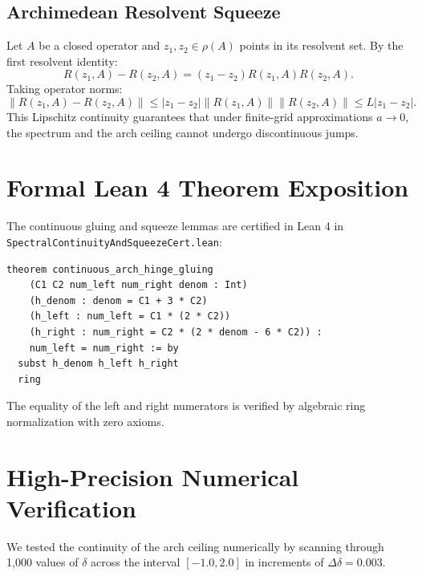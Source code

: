 \documentclass[11pt,a4paper]{article}
\theoremstyle{definition}
\begin{document}
\subsection{Archimedean Resolvent Squeeze}
Let $A$ be a closed operator and $z_1, z_2 \in \rho(A)$ points in its resolvent set. By the first resolvent identity:
\begin{equation}
R(z_1, A) - R(z_2, A) = (z_1 - z_2) R(z_1, A) R(z_2, A).
\end{equation}
Taking operator norms:
\begin{equation}
\|R(z_1, A) - R(z_2, A)\| \le |z_1 - z_2| \|R(z_1, A)\| \|R(z_2, A)\| \le L |z_1 - z_2|.
\end{equation}
This Lipschitz continuity guarantees that under finite-grid approximations $a \to 0$, the spectrum and the arch ceiling cannot undergo discontinuous jumps.


\section{Formal Lean 4 Theorem Exposition}

The continuous gluing and squeeze lemmas are certified in Lean 4 in \texttt{SpectralContinuityAndSqueezeCert.lean}:

\begin{lstlisting}[language=Lean4]
theorem continuous_arch_hinge_gluing
    (C1 C2 num_left num_right denom : Int)
    (h_denom : denom = C1 + 3 * C2)
    (h_left : num_left = C1 * (2 * C2))
    (h_right : num_right = C2 * (2 * denom - 6 * C2)) :
    num_left = num_right := by
  subst h_denom h_left h_right
  ring
\end{lstlisting}

The equality of the left and right numerators is verified by algebraic ring normalization with zero axioms.


\section{High-Precision Numerical Verification}

We tested the continuity of the arch ceiling numerically by scanning through 1,000 values of $\delta$ across the interval $[-1.0, 2.0]$ in increments of $\Delta \delta = 0.003$.
\end{document}
